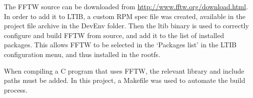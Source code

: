 		The FFTW source can be downloaded from \href{http://www.fftw.org/download.html}{http://www.fftw.org/download.html}.  In order to add it to LTIB, a custom RPM spec file was created, available in the project file archive in the DevEnv folder.  Then the ltib binary is used to correctly configure and build FFTW from source, and add it to the list of installed packages.  This allows FFTW to be selected in the `Packages list' in the LTIB configuration menu, and thus installed in the rootfs.

		When compiling a C program that uses FFTW, the relevant library and include paths must be added.  In this project, a Makefile was used to automate the build process.


